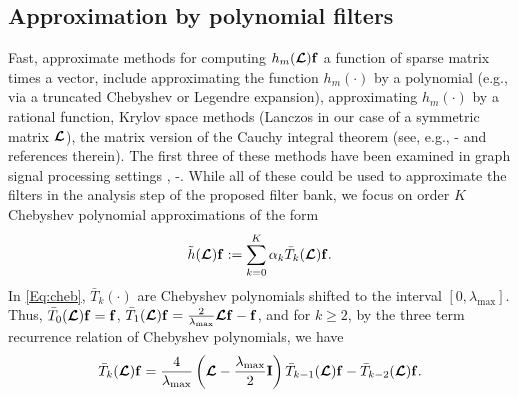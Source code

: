 \documentclass[journal, 10pt]{IEEEtran}
\begin{document}
\subsection{Approximation by polynomial filters} \label{Se:poly_approx}

Fast, approximate methods for computing $h_m(\boldsymbol{\mathcal{L}}){\bf f}$ a function of sparse matrix times a vector, include approximating the function $h_m(\cdot)$ by a polynomial (e.g., via a truncated Chebyshev or Legendre expansion), approximating $h_m(\cdot)$ by a rational function, Krylov space methods (Lanczos in our case of a symmetric matrix $\boldsymbol{\mathcal{L}}$), the matrix version of the Cauchy integral theorem (see, e.g., \cite{higham}\nocite{davies2005computing, frommer}-\cite{dubious} and references therein). The first three of these methods have been examined in graph signal processing settings \cite{hammond2011wavelets,PuyTGV15},  \cite{shuman_distributed_sipn}\nocite{susnjara, shi2015infinite}-\cite{loukas2015distributed}. While all of these could be used to approximate the filters in the analysis step of the proposed filter bank, we focus on order $K$ Chebyshev polynomial approximations of the form
\begin{align}\label{Eq:cheb}
\tilde{h}(\L){\bf f} := \sum_{k=0}^K \alpha_k \bar{T}_k(\L){\bf f}.
\end{align}
In \eqref{Eq:cheb}, $\bar{T}_k(\cdot)$ are Chebyshev polynomials shifted to the interval $[0,\lambda_{\max}]$. Thus,  $\bar{T}_0(\boldsymbol{\mathcal{L}}){\bf f} = {\bf f}$, $\bar{T}_1(\boldsymbol{\mathcal{L}}){\bf f} = \frac{2}{\lambda_{\max}}\boldsymbol{\mathcal{L}}{\bf f}-{\bf f}$, and for $k\geq 2$, by the three term recurrence relation of Chebyshev polynomials, we have
\begin{align*}
\bar{T}_k(\boldsymbol{\mathcal{L}}){\bf f} = \frac{4}{\lambda_{\max}}\left(\boldsymbol{\mathcal{L}}-\frac{\lambda_{\max}}{2}{\bf I}\right)\bar{T}_{k-1}(\boldsymbol{\mathcal{L}}){\bf f}-\bar{T}_{k-2}(\boldsymbol{\mathcal{L}}){\bf f}.
\end{align*}
\end{document}
